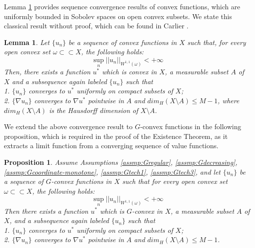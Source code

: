 \documentclass[a4paper, 11pt]{amsart}
\numberwithin{equation}{section}
\theoremstyle{plain}
\newtheorem{lemma}[theorem]{Lemma}
\newtheorem{proposition}[theorem]{Proposition}
\theoremstyle{definition}
\theoremstyle{remark}
\begin{document}
Lemma \ref{lemma1} provides sequence convergence results of convex functions, which are uniformly bounded in Sobolev spaces on open convex subsets. We state this classical result without proof, which can be found in Carlier \cite{Carlier01}.\medskip


\begin{lemma}\label{lemma1}
	Let $\{u_n\}$ be a sequence of convex functions in $X$ such that, for every open convex set $\omega \subset \subset X$, the following holds:
	\begin{equation*}
	\sup\limits_{n} ||u_n||_{W^{1,1}(\omega)} < +\infty
	\end{equation*}
	Then, there exists a function $u^*$ %
	which is convex in $X$, a measurable subset $A$ of $X$ and a subsequence again labeled $\{u_n\}$ such that\\
	1. $\{u_n\}$ converges to $u^*$ uniformly on compact subsets of $X$;\\
	2. $\{\nabla u_n\}$ converges to $\nabla u^*$ pointwise in $A$ and $dim_{H}(X\setminus A)\le M-1$, where $dim_{H}(X\setminus A)$ is the Hausdorff dimension of $X\setminus A$.
\end{lemma}

{We extend the above convergence result to $G$-convex functions in the following proposition, which is required in the proof of the Existence Theorem, as it extracts a limit function from a converging sequence of value functions.}

\begin{proposition}\label{proposition:convergence}
	Assume Assumptions \ref{assmp:Gregular}, \ref{assmp:Gdecreasing}, \ref{assmp:Gcoordinate-monotone}, \ref{assmp:Gtech1}, \ref{assmp:Gtech3}, and let $\{u_n\}$ be a sequence of $G$-convex functions in $X$ such that for every open convex set $\omega \subset \subset X$, the following holds:
	\begin{equation*}
	\sup\limits_{n} ||u_n||_{W^{1,1}(\omega )} < +\infty
	\end{equation*}
	Then there exists a function $u^*$ which is  $G$-convex in $X$, a measurable subset $A$ of $X$, and a subsequence again labeled $\{u_n\}$ such that\\
	1. $\{u_n\}$ converges to $u^*$ uniformly on compact subsets of $X$;\\
	2. $\{\nabla u_n\}$ converges to $\nabla u^*$ pointwise in $A$ and $dim_{H}(X\setminus A)\le M-1$.
\end{proposition}
\end{document}
